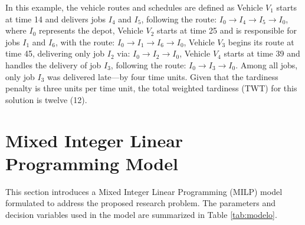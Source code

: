 \documentclass{article}
\begin{document}
In this example, the vehicle routes and schedules are defined as Vehicle $V_1$ starts at time 14 and delivers jobs $I_4$ and $I_5$, following the route: ${I_0 \rightarrow I_4 \rightarrow I_5 \rightarrow I_0}$, where $I_0$ represents the depot,  Vehicle $V_2$ starts at time 25 and is responsible for jobs $I_1$ and $I_6$, with the route: ${I_0 \rightarrow I_1 \rightarrow I_6 \rightarrow I_0}$, Vehicle $V_3$ begins its route at time 45, delivering only job $I_2$ via: ${I_0 \rightarrow I_2 \rightarrow I_0}$, Vehicle $V_4$ starts at time 39 and handles the delivery of job $I_3$, following the route: ${I_0 \rightarrow I_3 \rightarrow I_0}$. Among all jobs, only job $I_3$ was delivered late—by four time units. Given that the tardiness penalty is three units per time unit, the total weighted tardiness (TWT) for this solution is twelve (12).

\section{Mixed Integer Linear Programming Model}
\label{sec:Mixed_Integer_Linear_Programming}
This section introduces a Mixed Integer Linear Programming (MILP) model formulated to address the proposed research problem. The parameters and decision variables used in the model are summarized in Table \ref{tab:modelo}.
\end{document}
